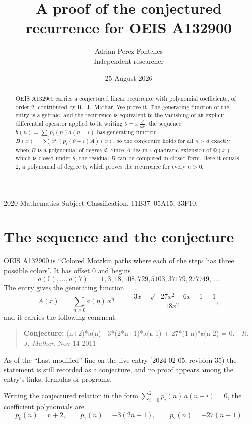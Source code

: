 \documentclass[11pt,a4paper]{article}
\title{A proof of the conjectured recurrence for OEIS A132900}
\author{Adrian Perez Fontelles\\ \small Independent researcher}
\date{25 August 2026}
\theoremstyle{plain}
\theoremstyle{definition}
\begin{document}
\maketitle

\begin{abstract}
OEIS A132900 carries a conjectured linear recurrence with polynomial coefficients, of
order 2, contributed by R.~J.~Mathar. We prove it. The generating function of the
entry is algebraic, and the recurrence is equivalent to the vanishing of an explicit
differential operator applied to it: writing $\theta=x\,\frac{d}{dx}$, the sequence
$b(n)=\sum_{i}p_{i}(n)a(n-i)$ has generating function
$B(x)=\sum_{i}x^{i}\,(p_{i}(\theta+i)A)(x)$, so the conjecture holds for all $n>d$ exactly
when $B$ is a polynomial of degree $d$. Since $A$ lies in a quadratic extension of
$\mathbb{Q}(x)$, which is closed under $\theta$, the residual $B$ can be computed in
closed form. Here it equals $2$, a polynomial of degree $0$, which proves
the recurrence for every $n>0$.
\end{abstract}

\noindent\small 2020 Mathematics Subject Classification. 11B37, 05A15, 33F10.\normalsize

\section{The sequence and the conjecture}

OEIS A132900 is ``Colored Motzkin paths where each of the steps has three possible colors''. It has offset $0$ and begins
\[
a(0),\dots,a(7)\;=\;1, 3, 18, 108, 729, 5103, 37179, 277749,\ \dots
\]
The entry gives the generating function
\begin{equation}\label{eq:gf}
A(x)\;=\;\sum_{n\ge 0} a(n)\,x^{n}\;=\;\frac{- 3 x - \sqrt{- 27 x^{2} - 6 x + 1} + 1}{18 x^{2}} ,
\end{equation}
and it carries the following comment:
\begin{quote}\small
\textbf{Conjecture:} (n+2)*a(n) - 3*(2*n+1)*a(n-1) + 27*(1-n)*a(n-2) = 0. - \emph{R. J. Mathar}, Nov 14 2011
\end{quote}
As of the ``Last modified'' line on the live entry (2024-02-05, revision 35) the
statement is still recorded as a conjecture, and no proof appears among the entry's links,
formulas or programs.

Writing the conjectured relation in the form $\sum_{i=0}^{2}p_{i}(n)\,a(n-i)=0$,
the coefficient polynomials are
\[
p_{0}(n)=n + 2,\qquad p_{1}(n)=- 3 \left(2 n + 1\right),\qquad p_{2}(n)=- 27 \left(n - 1\right)
\]
\end{document}
